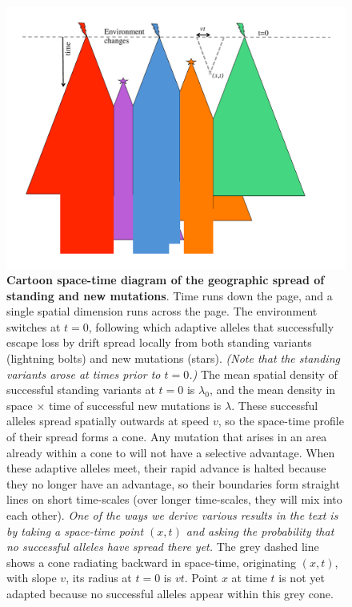 \documentclass{article}
\newcommand{\gc}[1]{{\it\color{blue} #1} }
\begin{document}
\begin{figure}[ht]
  \begin{center}
    \includegraphics[width=\textwidth]{spreading_alleles_trimmed_2}
  \end{center}
  \caption{
{\bf Cartoon space-time diagram of the geographic spread of standing and new mutations}. 
Time runs down the page, and a single spatial dimension runs across the page. 
The environment switches at $t=0$, 
following which adaptive alleles that successfully escape loss by drift
spread locally from both standing variants (lightning bolts) and new
mutations (stars). \gc{(Note that the standing variants arose at times
prior to $t=0$.)}
The mean spatial density of successful standing variants at $t=0$ is $\lambda_0$,
and the mean density in space $\times$ time of successful new mutations is $\lambda$.
These successful alleles spread spatially outwards at speed $v$, 
so the space-time profile of their spread forms a cone. Any mutation
that arises in an area already within a cone to will not have a selective advantage.
When these adaptive alleles meet, 
their rapid advance is halted because they no longer have an advantage,
so their boundaries form straight lines on short time-scales 
(over longer time-scales, they will mix into each other). 
\gc{One of the ways we derive various results in the text is by taking a
space-time point $(x,t)$ and asking the probability that no successful
alleles have spread there yet.} The grey dashed line shows a cone radiating backward in space-time,
originating $(x,t)$, with slope $v$, its radius at $t=0$ is $v t$. 
Point $x$ at time $t$ is not yet adapted because no successful alleles appear within this grey cone.
}
  \label{fig:cartoon}
\end{figure}
\end{document}
